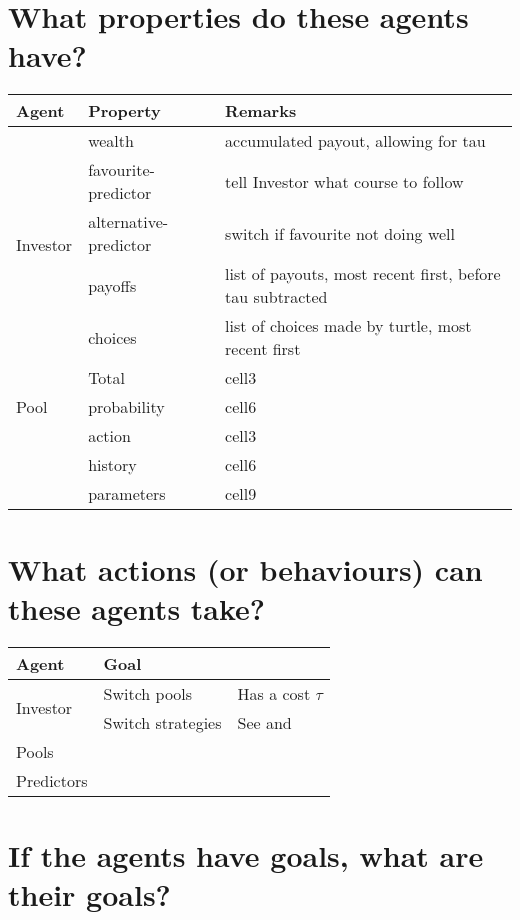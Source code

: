 \documentclass[]{article}
\begin{document}
\section{What properties do these agents have?}

\begin{center}
	\begin{tabular}{ |l|l|l| } 
		\hline
		Agent & Property & Remarks \\
		\hline
		\multirow{5}{4em}{Investor} & wealth & accumulated payout, allowing for tau \\ 
		& favourite-predictor & tell Investor what course to follow \\ 
		& alternative-predictor & switch if favourite not doing well \\ 
		& payoffs & list of payouts, most recent first, before tau subtracted \\ 
		& choices & list of choices made by turtle, most recent first \\ 
		\hline
		\multirow{3}{4em}{Pool} & Total & cell3 \\ 
		& probability & cell6 \\ 
		\hline
		\multirow{3}{4em}{Predictor} & action & cell3 \\ 
		& history & cell6 \\ 
		& parameters & cell9 \\ 
		\hline
	\end{tabular}
\end{center}



\section{What actions (or behaviours) can these agents take?}

\begin{tabular}{|l|l|l|} \hline
	Agent&Goal&\\ \hline
	\multirow{2}{4em}{Investor} & Switch pools & Has a cost $\tau$ \\ \cline{2-3}
	&Switch strategies &See \cite{arthur1994inductive} and \cite{fogel1999inductive}\\ \hline

	Pools && \\ \hline
	Predictors && \\ \hline
\end{tabular}


\section{If the agents have goals, what are their goals?}
\end{document}
